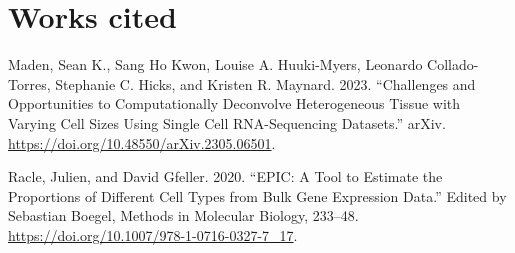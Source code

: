 \documentclass[]{article}
\newlength{\cslhangindent}
\newenvironment{CSLReferences}[2] %
 {%
  \setlength{\parindent}{0pt}
  \ifodd #1 \everypar{\setlength{\hangindent}{\cslhangindent}}\ignorespaces\fi
  \ifnum #2 > 0
  \setlength{\parskip}{#2\baselineskip}
  \fi
 }%
 {}
\begin{document}
\hypertarget{works-cited}{%
\section*{Works cited}\label{works-cited}}

\hypertarget{refs}{}
\begin{CSLReferences}{1}{0}
\leavevmode{}%
Maden, Sean K., Sang Ho Kwon, Louise A. Huuki-Myers, Leonardo Collado-Torres, Stephanie C. Hicks, and Kristen R. Maynard. 2023. {``Challenges and Opportunities to Computationally Deconvolve Heterogeneous Tissue with Varying Cell Sizes Using Single Cell {RNA}-Sequencing Datasets.''} arXiv. \url{https://doi.org/10.48550/arXiv.2305.06501}.

\leavevmode{}%
Racle, Julien, and David Gfeller. 2020. {``{EPIC}: {A} {Tool} to {Estimate} the {Proportions} of {Different} {Cell} {Types} from {Bulk} {Gene} {Expression} {Data}.''} Edited by Sebastian Boegel, Methods in {Molecular} {Biology}, 233--48. \url{https://doi.org/10.1007/978-1-0716-0327-7_17}.

\end{CSLReferences}
\end{document}
